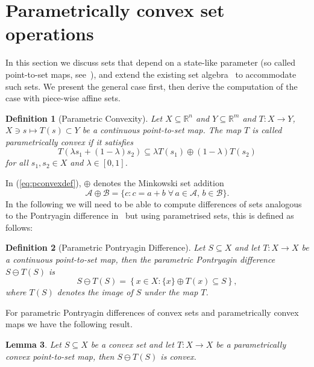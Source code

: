 \documentclass[letterpaper, 10pt, conference]{ieeeconf} %
\newtheorem{thm}{Lemma}[section]
\newtheorem{defn}[thm]{Definition}
\begin{document}
\section{Parametrically convex set operations}\label{sec:parametrically:convex:set:operations}
In this section we discuss sets that depend on a state-like parameter (so called point-to-set maps, 
see~\cite{Hogan:1973}), and extend the existing set algebra~\cite{blanchini:2007} to 
accommodate such sets. We present the general case first, then derive the computation of
the case with piece-wise affine sets.
%
%
    \begin{defn}[Parametric Convexity]\label{def:parametric:convexity}
      Let $X\subseteq\mathbb R^n$ and $Y\subseteq\mathbb R^m$ and $T:X\rightarrow Y$, $X\ni s\mapsto T(s)\subset Y$ be a 
      continuous point-to-set map. The map $T$ is called \emph{parametrically convex} if it satisfies
      \begin{equation}\label{eq:pconvexdef}
        T(\lambda s_1 + (1-\lambda)s_2)\subseteq\lambda T(s_1) \oplus (1-\lambda) T(s_2)
      \end{equation}
      for all $s_1,s_2\in X$ and $\lambda\in[0,1]$.
    \end{defn}
%
In (\ref{eq:pconvexdef}), $\oplus$ denotes the Minkowski set addition
      \begin{equation}
        \mathcal A\oplus\mathcal B = \{c : c = a + b\; \forall\,a\in\mathcal A,\, b\in\mathcal B\}.
      \end{equation}
%
    In the following we will need to be able to compute differences of sets
    analogous to the Pontryagin difference in~\cite{Kolmanovsky:1998} but using parametrised 
    sets, this is defined as follows:
%
    \begin{defn}[Parametric Pontryagin Difference]\label{def:parametric:pontryagin:difference}
Let $S\subseteq X$ and let $T:X\to X$ be a continuous point-to-set map,
then the \emph{parametric Pontryagin difference} $S\ominus T(S)$ is 
      \begin{equation}
        S\ominus T(S) = \left\{x\in X: \{x\} \oplus T(x)\subseteq S\right\},
      \end{equation}
      where $T(S)$ denotes the image of $S$ under the map $T$.
    \end{defn}
%
    For parametric Pontryagin differences of convex sets and parametrically convex maps we have the following result.
%
    \begin{thm}\label{thm:convexity:of:pontryagin:difference}
      Let $S\subseteq X$ be a convex set and let $T:X\rightarrow X$ be a parametrically convex point-to-set
      map, then $S\ominus T(S)$ is convex. 
    \end{thm}
\end{document}
